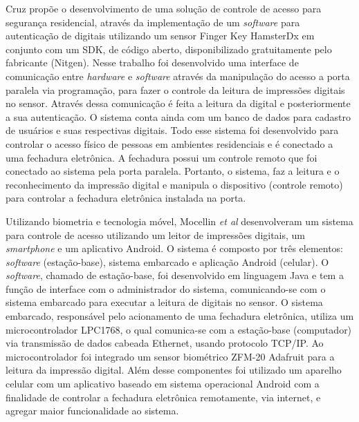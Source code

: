  
  Cruz \cite{cruz2013biometria} propõe o desenvolvimento de uma solução de controle de acesso para segurança residencial, através da implementação de um \textit{software} para autenticação de digitais utilizando um sensor Finger Key HamsterDx em conjunto com um SDK, de código aberto, disponibilizado gratuitamente pelo fabricante (Nitgen). Nesse trabalho foi desenvolvido uma interface de comunicação entre \textit{hardware} e \textit{software} através da manipulação do acesso a porta paralela via programação, para fazer o controle da leitura de impressões digitais no sensor. Através dessa comunicação é feita a leitura da digital e posteriormente a sua autenticação. O sistema conta ainda com um banco de dados para cadastro de usuários e suas respectivas digitais. Todo esse sistema foi desenvolvido para controlar o acesso físico de pessoas em ambientes residenciais e é conectado a uma fechadura eletrônica. A fechadura possui um controle remoto que foi conectado ao sistema pela porta paralela. Portanto, o sistema, faz a leitura e o reconhecimento da impressão digital e manipula o dispositivo (controle remoto) para controlar a fechadura eletrônica instalada na porta.


 
 Utilizando biometria e tecnologia móvel, Mocellin \textit{et al} \cite{mocellin2012trava} desenvolveram um sistema para controle de acesso utilizando um leitor de impressões digitais, um \textit{smartphone} e um aplicativo Android. O sistema é composto por três elementos: \textit{software} (estação-base), sistema embarcado e aplicação Android (celular). O \textit{software}, chamado de estação-base, foi desenvolvido em linguagem Java e tem a função de interface com o administrador do sistema, comunicando-se com o sistema embarcado para executar a leitura de digitais no sensor. O sistema embarcado, responsável pelo acionamento de uma fechadura eletrônica, utiliza um microcontrolador LPC1768, o qual comunica-se com a estação-base (computador) via transmissão de dados cabeada Ethernet, usando protocolo TCP/IP. Ao microcontrolador foi integrado um sensor biométrico ZFM-20 Adafruit para a leitura da impressão digital. Além desse componentes foi utilizado um aparelho celular com um aplicativo baseado em sistema operacional Android com a finalidade de controlar a fechadura eletrônica remotamente, via internet, e agregar maior funcionalidade ao sistema.




